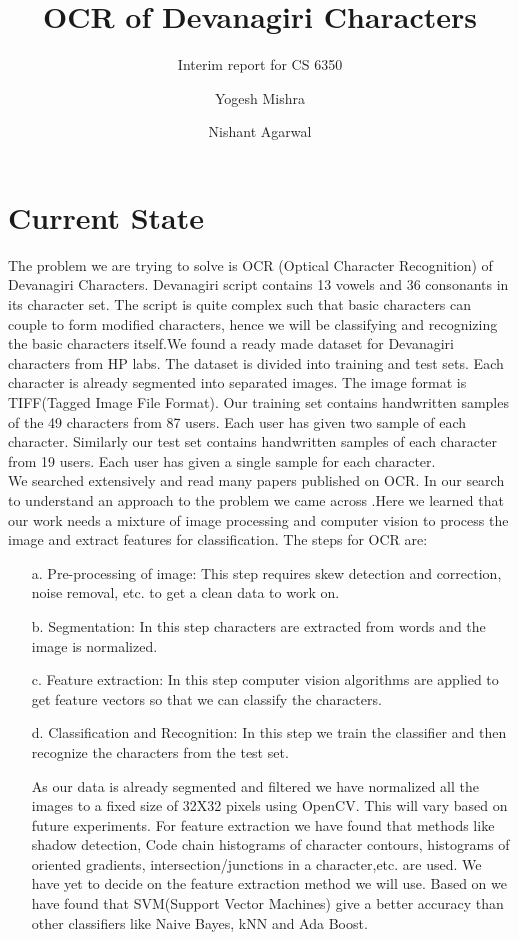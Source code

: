 \documentclass[11pt,twocolumn]{scrartcl}
\title{OCR of Devanagiri Characters }
\subtitle{Interim report for CS 6350}
\author{Yogesh Mishra \and Nishant Agarwal}
\date{}
\begin{document}
\maketitle
\section{Current State}
\label{sec:Current State}
The problem we are trying to solve is OCR (Optical Character Recognition) of Devanagiri Characters.  Devanagiri script contains 13 vowels and 36 consonants in its character set. The script is quite complex such that basic characters can couple to form modified characters, hence we will be classifying and recognizing the basic characters itself.We found a ready made dataset for Devanagiri characters from HP labs\cite{Data}. The dataset is divided into training and test sets. Each character is already segmented into separated images. The image format is TIFF(Tagged Image File Format). Our training set contains handwritten samples of the 49 characters from 87 users. Each user has given two sample of each character. Similarly our test set contains handwritten samples of each character from 19 users. Each user has given a single sample for each character.\\
We searched extensively and read many papers published on OCR. In our search to understand an approach to the problem we came across \cite{arora2008combining}\cite{bhattacharjee2010performance}\cite{birajdar2015recognition}\cite{dongre2013devnagari}\cite{goyal2010optical}\cite{Neural}.Here we learned that our work needs a mixture of image processing and computer vision to process the image and extract features for classification. The steps for OCR are:
\begin{itemize}
\item[a.] Pre-processing of image: This step requires skew detection and correction, noise removal, etc. to get a clean data to work on.
\item[b.] Segmentation: In this step characters are extracted from words and the image is normalized.
\item[c.] Feature extraction: In this step computer vision algorithms are applied to get feature vectors so that we can classify the characters.
\item[d.] Classification and Recognition: In this step we train the classifier and then recognize the characters from the test set.

As our data is already segmented and filtered we have normalized all the images to a fixed size of 32X32 pixels using OpenCV\cite{OpenCV}. This will vary based on future experiments. For feature extraction we have found that methods like shadow detection, Code chain histograms of character contours, histograms of oriented gradients, intersection/junctions in a character,etc. are  used. We have yet to decide on the feature extraction method we will use. Based on \cite{arora2008combining}\cite{bhattacharjee2010performance}\cite{birajdar2015recognition}\cite{dongre2013devnagari}\cite{goyal2010optical}\cite{Neural} we have found that SVM(Support Vector Machines) give a better accuracy than other classifiers like Naive Bayes, kNN and Ada Boost. 
\end{itemize}
\end{document}
